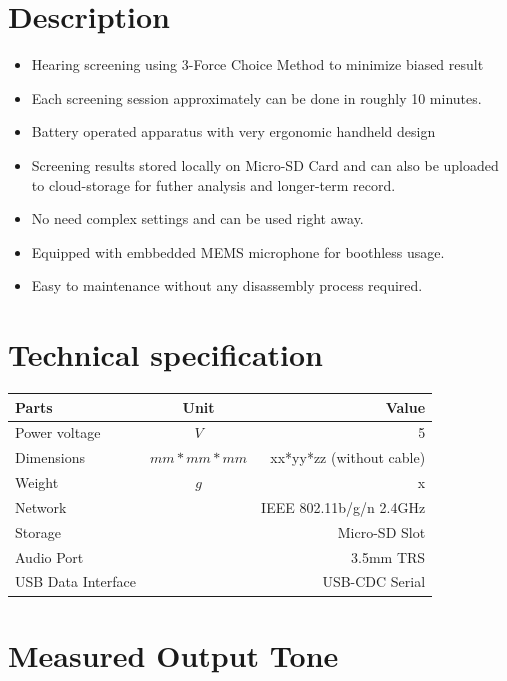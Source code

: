 \documentclass[a4paper,12pt,oneside,pdflatex,italian,final,twocolumn]{article}
\begin{document}
\section{Description}
\begin{itemize}

\item Hearing screening using 3-Force Choice Method to minimize biased result

\item Each screening session approximately can be done in roughly 10 minutes.

\item Battery operated apparatus with very ergonomic handheld design

\item Screening results stored locally on Micro-SD Card and can also be uploaded to cloud-storage for futher analysis and longer-term record.

\item No need complex settings and can be used right away.

\item Equipped with embbedded MEMS microphone for boothless usage.

\item Easy to maintenance without any disassembly process required.

\end{itemize}

\section{Technical specification}
\centering
\begin{tabular}{lcr}
\toprule
Parts & Unit & Value \\
\midrule
Power voltage & $V$ & 5 \\
Dimensions & $mm*mm*mm$ & xx*yy*zz (without cable) \\
Weight & $g$ & x \\
Network & & IEEE 802.11b/g/n 2.4GHz \\
Storage & & Micro-SD Slot \\
Audio Port & & 3.5mm TRS \\
USB  Data Interface & & USB-CDC Serial \\
\bottomrule
\end{tabular}

\raggedright

\section{Measured Output Tone}
\end{document}
